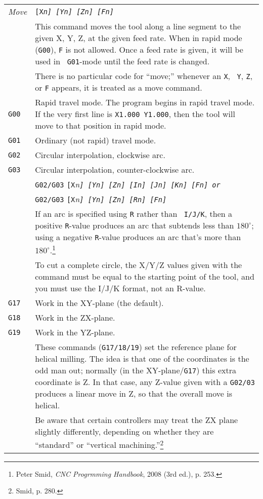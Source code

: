 \documentclass[titlepage,oneside,10pt]{article}
\begin{document}
\vskip 0.25cm
\begin{longtable}{lp{10cm}}
\em{Move} & \tt{[X}\em{n}\tt{]} \tt{[Y}\em{n}\tt{]}
\tt{[Z}\em{n}\tt{]} \tt{[F}\em{n}\tt{]} \\ 
& This command moves the tool along a line segment to the given X, Y,
Z, at the given feed rate. When in rapid mode ({\tt G00}), {\tt F} is
not allowed. Once a feed rate is given, it will be used in {\tt
  G01}-mode until the feed rate is changed.\\
& There is no particular code for ``move;'' whenever an {\tt X}, {\tt
  Y}, {\tt Z}, or {\tt F} appears, it is treated as a move command.\\
{\tt G00}&Rapid travel mode. The program begins in rapid travel
mode. If the very first line is {\tt X1.000 Y1.000}, then the tool
will move to that position in rapid mode.\\
{\tt G01}&Ordinary (not rapid) travel mode.\\
{\tt G02}& Circular interpolation, clockwise arc.\\
{\tt G03}&Circular interpolation, counter-clockwise arc. \\
& {\tt G02/G03} {\tt [X}\em{n}\tt{]} \tt{[Y}\em{n}\tt{]}
\tt{[Z}\em{n}\tt{]} {\tt [I}\em{n}\tt{]} \tt{[J}\em{n}\tt{]}
\tt{[K}\em{n}\tt{]} \tt{[F}\em{n}{\tt ]} \emph{or} \\
&{\tt G02/G03} {\tt [X}\em{n}\tt{]} \tt{[Y}\em{n}\tt{]} \tt{[Z}\em{n}\tt{]}
\tt{[R}\em{n}\tt{]} \tt{[F}\em{n}\tt{]}\\
&If an arc is specified using {\tt R} rather than {\tt
  I/J/K}, then a positive {\tt R}-value produces an arc that subtends
less than $180^\circ$; using a negative {\tt R}-value produces an arc
that's more than $180^\circ$.\footnote{Peter Smid,
\emph{CNC Progrmming Handbook}, 2008 (3rd ed.), p. 253.}\\
&To cut a complete circle, the X/Y/Z values given with the command
must be equal to the starting point of the tool, and you must use
the I/J/K format, not an R-value.\\
{\tt G17}& Work in the XY-plane (the default).\\
{\tt G18}& Work in the ZX-plane.\\
{\tt G19}& Work in the YZ-plane.\\
&These commands ({\tt G17/18/19}) set the reference plane for
helical milling. The idea is that one of the coordinates is the odd
man out; normally (in the XY-plane/{\tt G17}) this extra coordinate is
Z. In that case, any Z-value given with a {\tt G02/03} produces a
linear move in Z, so that the overall move is helical. \\
&Be aware that certain controllers may treat the ZX plane slightly
differently, depending on whether they are ``standard'' or ``vertical
machining.''\footnote{Smid, p. 280.}
\end{longtable}
\end{document}
